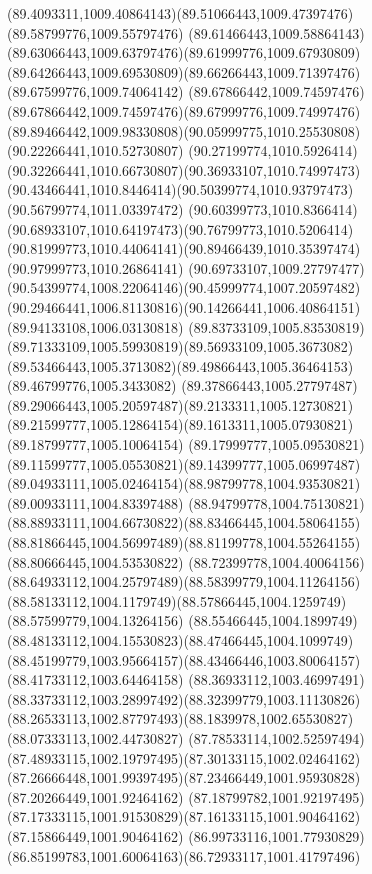 {{	\curveto(89.4093311,1009.40864143)(89.51066443,1009.47397476)(89.58799776,1009.55797476)
	\curveto(89.61466443,1009.58864143)(89.63066443,1009.63797476)(89.61999776,1009.67930809)
	\curveto(89.64266443,1009.69530809)(89.66266443,1009.71397476)(89.67599776,1009.74064142)
	\curveto(89.67866442,1009.74597476)(89.67866442,1009.74597476)(89.67999776,1009.74997476)
	\curveto(89.89466442,1009.98330808)(90.05999775,1010.25530808)(90.22266441,1010.52730807)
	\curveto(90.27199774,1010.5926414)(90.32266441,1010.66730807)(90.36933107,1010.74997473)
	\curveto(90.43466441,1010.8446414)(90.50399774,1010.93797473)(90.56799774,1011.03397472)
	\curveto(90.60399773,1010.8366414)(90.68933107,1010.64197473)(90.76799773,1010.5206414)
	\curveto(90.81999773,1010.44064141)(90.89466439,1010.35397474)(90.97999773,1010.26864141)
	\curveto(90.69733107,1009.27797477)(90.54399774,1008.22064146)(90.45999774,1007.20597482)
	\curveto(90.29466441,1006.81130816)(90.14266441,1006.40864151)(89.94133108,1006.03130818)
	\curveto(89.83733109,1005.83530819)(89.71333109,1005.59930819)(89.56933109,1005.3673082)
	\curveto(89.53466443,1005.3713082)(89.49866443,1005.36464153)(89.46799776,1005.3433082)
	\curveto(89.37866443,1005.27797487)(89.29066443,1005.20597487)(89.2133311,1005.12730821)
	\curveto(89.21599777,1005.12864154)(89.1613311,1005.07930821)(89.18799777,1005.10064154)
	\curveto(89.17999777,1005.09530821)(89.11599777,1005.05530821)(89.14399777,1005.06997487)
	\curveto(89.04933111,1005.02464154)(88.98799778,1004.93530821)(89.00933111,1004.83397488)
	\curveto(88.94799778,1004.75130821)(88.88933111,1004.66730822)(88.83466445,1004.58064155)
	\curveto(88.81866445,1004.56997489)(88.81199778,1004.55264155)(88.80666445,1004.53530822)
	\curveto(88.72399778,1004.40064156)(88.64933112,1004.25797489)(88.58399779,1004.11264156)
	\curveto(88.58133112,1004.1179749)(88.57866445,1004.1259749)(88.57599779,1004.13264156)
	\curveto(88.55466445,1004.1899749)(88.48133112,1004.15530823)(88.47466445,1004.1099749)
	\curveto(88.45199779,1003.95664157)(88.43466446,1003.80064157)(88.41733112,1003.64464158)
	\curveto(88.36933112,1003.46997491)(88.33733112,1003.28997492)(88.32399779,1003.11130826)
	\curveto(88.26533113,1002.87797493)(88.1839978,1002.65530827)(88.07333113,1002.44730827)
	\curveto(87.78533114,1002.52597494)(87.48933115,1002.19797495)(87.30133115,1002.02464162)
	\curveto(87.26666448,1001.99397495)(87.23466449,1001.95930828)(87.20266449,1001.92464162)
	\curveto(87.18799782,1001.92197495)(87.17333115,1001.91530829)(87.16133115,1001.90464162)
	\lineto(87.15866449,1001.90464162)
	\curveto(86.99733116,1001.77930829)(86.85199783,1001.60064163)(86.72933117,1001.41797496)
}}
